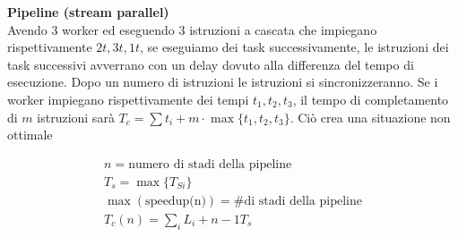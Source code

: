 




\begin{defn}
	\textbf{Pipeline (stream parallel)}\\
	Avendo 3 worker ed eseguendo 3 istruzioni a cascata che impiegano
	rispettivamente $ 2t, 3t, 1t $, se eseguiamo dei task successivamente, le
	istruzioni dei task successivi avverrano con un delay dovuto alla differenza del
	tempo di esecuzione. Dopo un numero di istruzioni le istruzioni si
	sincronizzeranno. Se i worker impiegano rispettivamente dei tempi $ t_1,t_2,t_3
	$, il tempo di completamento di $ m $ istruzioni sarà $ T_c = \sum t_i + m \cdot
	\max\{t_1,t_2,t_3\} $. Ciò crea una situazione non ottimale
	
	\[ \begin{aligned}
	n = \text{numero di stadi della pipeline} \\
	T_s = \max\{T_{Si}\} \\
	\max(\text{speedup(n)}) = \text{\# di stadi della pipeline} \\
	T_c (n) = \sum_i L_i + n-1 T_s \end{aligned} \]
	
\end{defn}


